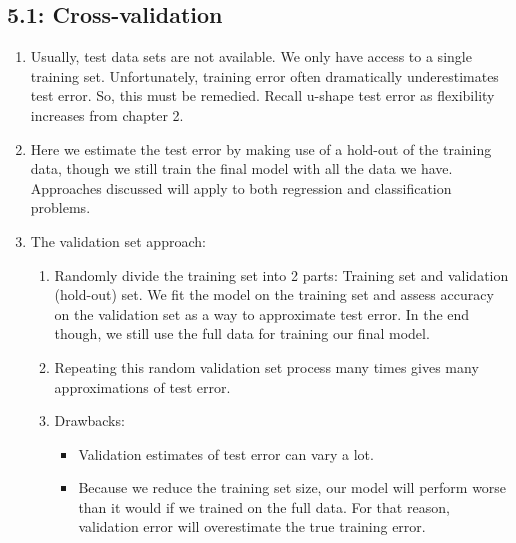 \documentclass{article}
\begin{document}
\subsection*{5.1: Cross-validation}

\begin{enumerate}
\item Usually, test data sets are not available. We only have access to a single training set. Unfortunately, training error often dramatically underestimates test error. So, this must be remedied. Recall u-shape test error as flexibility increases from chapter 2.

\item Here we estimate the test error by making use of a hold-out of the training data, though we still train the final model with all the data we have. Approaches discussed will apply to both regression and classification problems.

\item The validation set approach:
\begin{enumerate}
\item Randomly divide the training set into 2 parts: Training set and validation (hold-out) set. We fit the model on the training set and assess accuracy on the validation set as a way to approximate test error. In the end though, we still use the full data for training our final model.
\item Repeating this random validation set process many times gives many approximations of test error. 
\item Drawbacks:
\begin{itemize}
\item Validation estimates of test error can vary a lot.
\item Because we reduce the training set size, our model will perform worse than it would if we trained on the full data. For that reason, validation error will overestimate the true training error.
\end{itemize}
\end{enumerate}


\end{enumerate}
\end{document}
